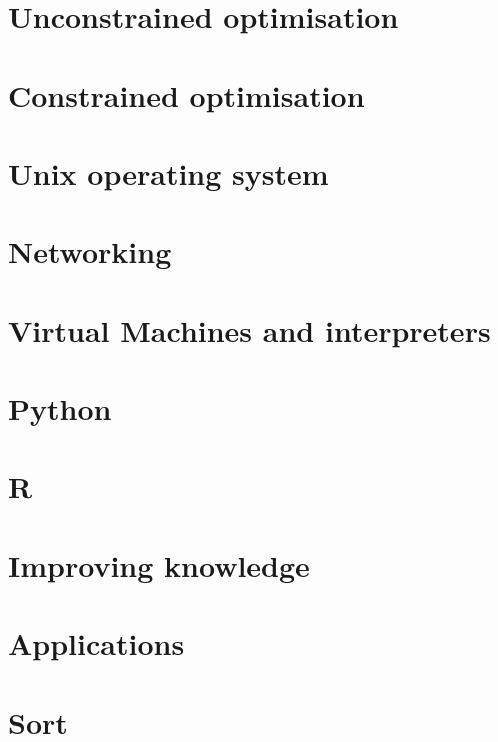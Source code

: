 \documentclass[oneside]{book}
\begin{document}
\part{Unconstrained optimisation}





\part{Constrained optimisation}


\part{Unix operating system}


\part{Networking}

\part{Virtual Machines and interpreters}





\part{Python}







\part{R}










\part{Improving knowledge}



\part{Applications}





\part{Sort}

	
\end{document}
